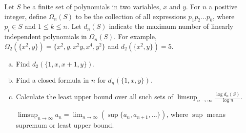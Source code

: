 Let $S$ be a finite set of polynomials in two variables, $x$ and $y$. For $n$ a
positive integer, define $\Omega_n(S)$ to be the collection of all expressions
$p_1 p_2 ... p_k$, where $p_i \in S$ and $1 \le k \le n$. Let $d_n(S)$ indicate
the maximum number of linearly independent polynomials in $\Omega_n(S)$. For
example, $\Omega_2(\lbrace x^2, y \rbrace) = \lbrace x^2, y, x^2 y, x^4, y^2
\rbrace$ and $d_2(\lbrace x^2, y \rbrace) = 5$.

\begin{enumerate}[(a)]
\item Find $d_2(\lbrace 1, x, x + 1, y \rbrace)$.

\item Find a closed formula in $n$ for $d_n(\lbrace 1, x, y \rbrace)$.

\item Calculate the least upper bound over all such sets of
      $\displaystyle{ \limsup_{n \to \infty} \frac{\log d_n(S)}{\log n} }$.

      $\displaystyle{
          \limsup_{n \to \infty} a_n =
          \lim_{n \to \infty}(\sup \lbrace a_n, a_{n + 1},... \rbrace)
      }$, where $\sup$ means supremum or least upper bound.
\end{enumerate}
